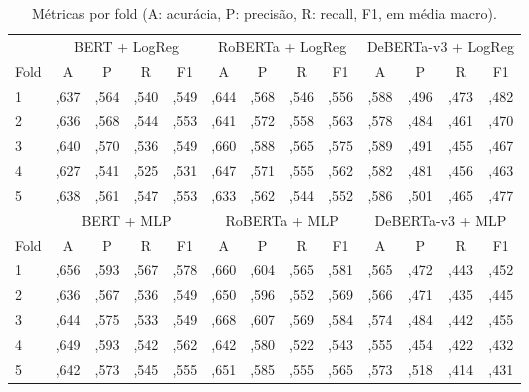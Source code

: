 \documentclass[11pt,a4paper]{article}
\begin{document}
\begin{table}[H]
\centering
\small
\caption{Métricas por fold (A: acurácia, P: precisão, R: recall, F1, em média macro).}
\label{tab:folds}
\setlength{\tabcolsep}{4pt}
\begin{tabular}{l|cccc|cccc|cccc}
\toprule
& \multicolumn{4}{c|}{BERT + LogReg} & \multicolumn{4}{c|}{RoBERTa + LogReg} & \multicolumn{4}{c}{DeBERTa-v3 + LogReg} \\
Fold & A & P & R & F1 & A & P & R & F1 & A & P & R & F1 \\
\midrule
1 & ,637 & ,564 & ,540 & ,549 & ,644 & ,568 & ,546 & ,556 & ,588 & ,496 & ,473 & ,482 \\
2 & ,636 & ,568 & ,544 & ,553 & ,641 & ,572 & ,558 & ,563 & ,578 & ,484 & ,461 & ,470 \\
3 & ,640 & ,570 & ,536 & ,549 & ,660 & ,588 & ,565 & ,575 & ,589 & ,491 & ,455 & ,467 \\
4 & ,627 & ,541 & ,525 & ,531 & ,647 & ,571 & ,555 & ,562 & ,582 & ,481 & ,456 & ,463 \\
5 & ,638 & ,561 & ,547 & ,553 & ,633 & ,562 & ,544 & ,552 & ,586 & ,501 & ,465 & ,477 \\
\midrule
& \multicolumn{4}{c|}{BERT + MLP} & \multicolumn{4}{c|}{RoBERTa + MLP} & \multicolumn{4}{c}{DeBERTa-v3 + MLP} \\
Fold & A & P & R & F1 & A & P & R & F1 & A & P & R & F1 \\
\midrule
1 & ,656 & ,593 & ,567 & ,578 & ,660 & ,604 & ,565 & ,581 & ,565 & ,472 & ,443 & ,452 \\
2 & ,636 & ,567 & ,536 & ,549 & ,650 & ,596 & ,552 & ,569 & ,566 & ,471 & ,435 & ,445 \\
3 & ,644 & ,575 & ,533 & ,549 & ,668 & ,607 & ,569 & ,584 & ,574 & ,484 & ,442 & ,455 \\
4 & ,649 & ,593 & ,542 & ,562 & ,642 & ,580 & ,522 & ,543 & ,555 & ,454 & ,422 & ,432 \\
5 & ,642 & ,573 & ,545 & ,555 & ,651 & ,585 & ,555 & ,565 & ,573 & ,518 & ,414 & ,431 \\
\bottomrule
\end{tabular}
\end{table}
\end{document}
